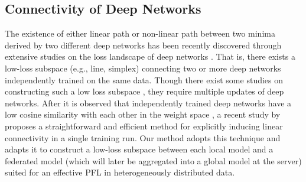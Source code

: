 \documentclass[sigconf]{acmart}
\begin{document}
\subsection{Connectivity of Deep Networks} The existence of either linear path \cite{frankle20} or non-linear path \cite{garipov+18, draxler18} between two minima derived by two different deep networks has been recently discovered through extensive studies on the loss landscape of deep networks \cite{fort2019deep, fort2019large, modeconnect, garipov+18, draxler18}. That is, there exists a low-loss subspace (e.g., line, simplex) connecting two or more deep networks independently trained on the same data. Though there exist some studies on constructing such a low loss subspace \cite{blundell+15, snapshot, swa, swa-gaussian, izmailov2020subspace, deepensembles}, they require multiple updates of deep networks. After it is observed that independently trained deep networks have a low cosine similarity with each other in the weight space \cite{fort2019deep}, a recent study by \cite{nnsubspaces} proposes a straightforward and efficient method for explicitly inducing linear connectivity in a single training run. Our method adopts this technique and adapts it to construct a low-loss subspace between each local model and a federated model (which will later be aggregated into a global model at the server) suited for an effective PFL in heterogeneously distributed data.
\end{document}
